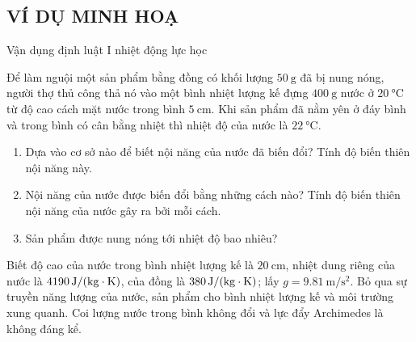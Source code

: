 \subsection{VÍ DỤ MINH HOẠ}
\begin{dang}{Vận dụng định luật I nhiệt động lực học}
\end{dang}
\begin{vd}
Để làm nguội một sản phẩm bằng đồng có khối lượng $\SI{50}{\gram}$ đã bị nung nóng, người thợ thủ công thả nó vào một bình nhiệt lượng kế đựng $\SI{400}{\gram}$ nước ở $\SI{20}{\celsius}$ từ độ cao cách mặt nước trong bình $\SI{5}{\centi\meter}$. Khi sản phẩm đã nằm yên ở đáy bình và trong bình có cân bằng nhiệt thì nhiệt độ của nước là $\SI{22}{\celsius}$.
		\begin{enumerate}[label=\alph*)]
			\item Dựa vào cơ sở nào để biết nội năng của nước đã biến đổi? Tính độ biến thiên nội năng này.
			\item Nội năng của nước được biến đổi bằng những cách nào? Tính độ biến thiên nội năng của nước gây ra bởi mỗi cách.
			\item Sản phẩm được nung nóng tới nhiệt độ bao nhiêu?
		\end{enumerate}
		Biết độ cao của nước trong bình nhiệt lượng kế là $\SI{20}{\centi\meter}$, nhiệt dung riêng của nước là $\SI{4190}{\joule/\left(\kilogram\cdot\kelvin\right)}$, của đồng là $\SI{380}{\joule/\left(\kilogram\cdot\kelvin\right)}$; lấy $g=\SI{9.81}{\meter/\second^2}$. Bỏ qua sự truyền năng lượng của nước, sản phẩm cho bình nhiệt lượng kế và môi trường xung quanh. Coi lượng nước trong bình không đổi và lực đẩy Archimedes là không đáng kể.
\end{vd}
